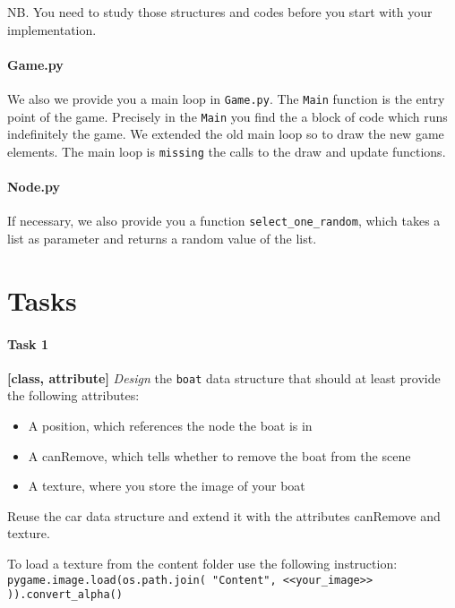 \documentclass[10pt,a4paper]{article}
\begin{document}
\noindent
NB. You need to study those structures and codes before you start with your implementation. 
	
\paragraph{Game.py}


We also we provide you a main loop in \texttt{Game.py}. The \texttt{Main} function is the entry point of the game. Precisely in the \texttt{Main} you find the a block of code which runs indefinitely the game. We extended the old main loop so to draw the new game elements. The main loop is \texttt{missing} the calls to the draw and update functions.

\paragraph{Node.py}


If necessary, we also provide you a function \texttt{select\_one\_random}, which takes a list as parameter and returns a random value of the list.

\section{Tasks}	

\paragraph{Task 1} \textbf{[class, attribute]} \textit{Design} the \texttt{boat} data structure that should at least provide the following attributes:
\begin{itemize}[noitemsep,nolistsep]
	\item A position, which references the node the boat is in
	\item A canRemove, which tells whether to remove the boat from the scene
	\item A texture, where you store the image of your boat
\end{itemize}
Reuse the car data structure and extend it with the attributes canRemove and texture. 


To load a texture from the content folder use the following instruction: \\
\texttt{pygame.image.load(os.path.join( "Content", <<your\_image>> )).convert\_alpha()}
\end{document}
